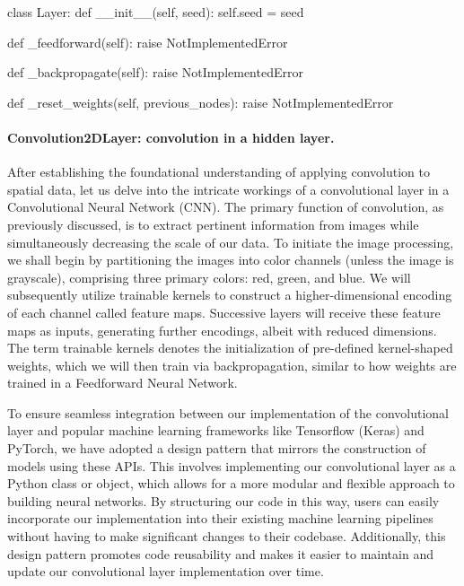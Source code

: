 \documentclass[%
oneside,                 %
final,                   %
10pt]{article}
\begin{document}
class Layer:
    def __init__(self, seed):
        self.seed = seed

    def _feedforward(self):
        raise NotImplementedError

    def _backpropagate(self):
        raise NotImplementedError

    def _reset_weights(self, previous_nodes):
        raise NotImplementedError

\epycod


\paragraph{Convolution2DLayer: convolution in a hidden layer.}
After establishing the foundational understanding of applying
convolution to spatial data, let us delve into the intricate workings
of a convolutional layer in a Convolutional Neural Network (CNN). The
primary function of convolution, as previously discussed, is to
extract pertinent information from images while simultaneously
decreasing the scale of our data. To initiate the image processing, we
shall begin by partitioning the images into color channels (unless the
image is grayscale), comprising three primary colors: red, green, and
blue. We will subsequently utilize trainable kernels to construct a
higher-dimensional encoding of each channel called feature
maps. Successive layers will receive these feature maps as inputs,
generating further encodings, albeit with reduced dimensions. The term
trainable kernels denotes the initialization of pre-defined
kernel-shaped weights, which we will then train via backpropagation,
similar to how weights are trained in a Feedforward Neural Network.

To ensure seamless integration between our implementation of the
convolutional layer and popular machine learning frameworks like
Tensorflow (Keras) and PyTorch, we have adopted a design pattern that
mirrors the construction of models using these APIs. This involves
implementing our convolutional layer as a Python class or object,
which allows for a more modular and flexible approach to building
neural networks. By structuring our code in this way, users can easily
incorporate our implementation into their existing machine learning
pipelines without having to make significant changes to their
codebase. Additionally, this design pattern promotes code reusability
and makes it easier to maintain and update our convolutional layer
implementation over time.
\end{document}
